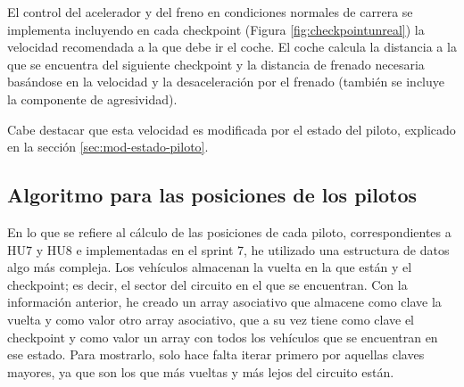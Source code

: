 El control del acelerador y del freno en condiciones normales de carrera se implementa incluyendo en cada checkpoint (Figura \ref{fig:checkpointunreal}) la velocidad recomendada a la que debe ir el coche. El coche calcula la distancia a la que se encuentra del siguiente checkpoint y la distancia de frenado necesaria basándose en la velocidad y la desaceleración por el frenado (también se incluye la componente de agresividad).

\bigskip

Cabe destacar que esta velocidad es modificada por el estado del piloto, explicado en la sección \ref{sec:mod-estado-piloto}.


\subsection{Algoritmo para las posiciones de los pilotos}

En lo que se refiere al cálculo de las posiciones de cada piloto, correspondientes a HU7 y HU8 e implementadas en el sprint 7, he utilizado una estructura de datos algo más compleja. Los vehículos almacenan la vuelta en la que están y el checkpoint; es decir, el sector del circuito en el que se encuentran. Con la información anterior, he creado un array asociativo que almacene como clave la vuelta y como valor otro array asociativo, que a su vez tiene como clave el checkpoint y como valor un array con todos los vehículos que se encuentran en ese estado. Para mostrarlo, solo hace falta iterar primero por aquellas claves mayores, ya que son los que más vueltas y más lejos del circuito están.

